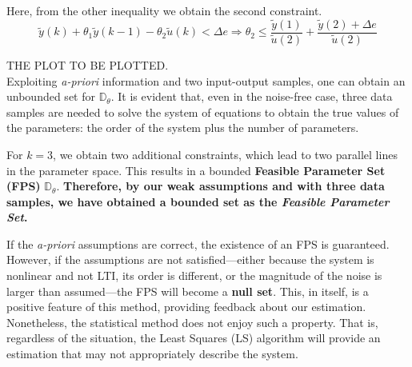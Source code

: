Here, from the other inequality we obtain the second constraint.\\
\[
\tilde{y}(k) + \theta_1\tilde{y}(k-1) - \theta_2 \tilde{u}(k) <\Delta e \Rightarrow
\theta_2\leq \frac{\tilde{y}(1)}{\tilde{u}(2)} + \frac{\tilde{y}(2) + \Delta e}{\tilde{u}(2)}
\]

THE PLOT TO BE PLOTTED.\\

Exploiting \textit{a-priori} information and two input-output samples, one can obtain an unbounded set for $\mathbb{D}_\theta$. It is evident that, even in the noise-free case, three data samples are needed to solve the system of equations to obtain the true values of the parameters: the order of the system plus the number of parameters. 

For $k = 3$, we obtain two additional constraints, which lead to two parallel lines in the parameter space. This results in a bounded \textbf{Feasible Parameter Set (FPS)} $\mathbb{D}_\theta$. \textbf{Therefore, by our weak assumptions and with three data samples, we have obtained a bounded set as the \textit{Feasible Parameter Set}.}

\begin{factbox}
If the \textit{a-priori} assumptions are correct, the existence of an FPS is guaranteed. However, if the assumptions are not satisfied—either because the system is nonlinear and not LTI, its order is different, or the magnitude of the noise is larger than assumed—the FPS will become a \textbf{null set}. This, in itself, is a positive feature of this method, providing feedback about our estimation. Nonetheless, the statistical method does not enjoy such a property. That is, regardless of the situation, the Least Squares (LS) algorithm will provide an estimation that may not appropriately describe the system.
\end{factbox}

